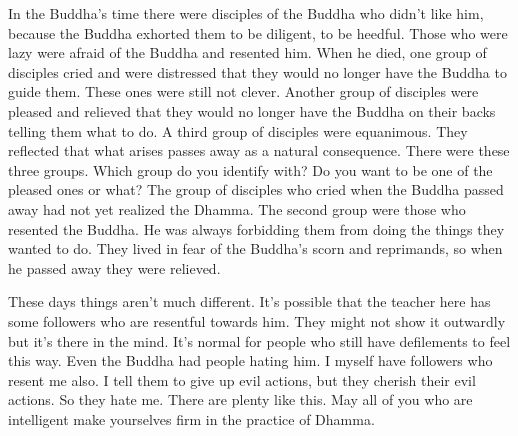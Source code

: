 In the Buddha's time there were disciples of the Buddha who didn't like him, because the Buddha exhorted them to be diligent, to be heedful. Those who were lazy were afraid of the Buddha and resented him. When he died, one group of disciples cried and were distressed that they would no longer have the Buddha to guide them. These ones were still not clever. Another group of disciples were pleased and relieved that they would no longer have the Buddha on their backs telling them what to do. A third group of disciples were equanimous. They reflected that what arises passes away as a natural consequence. There were these three groups. Which group do you identify with? Do you want to be one of the pleased ones or what? The group of disciples who cried when the Buddha passed away had not yet realized the Dhamma. The second group were those who resented the Buddha. He was always forbidding them from doing the things they wanted to do. They lived in fear of the Buddha's scorn and reprimands, so when he passed away they were relieved. 

These days things aren't much different. It's possible that the teacher here has some followers who are resentful towards him. They might not show it outwardly but it's there in the mind. It's normal for people who still have defilements to feel this way. Even the Buddha had people hating him. I myself have followers who resent me also. I tell them to give up evil actions, but they cherish their evil actions. So they hate me. There are plenty like this. May all of you who are intelligent make yourselves firm in the practice of Dhamma.  
